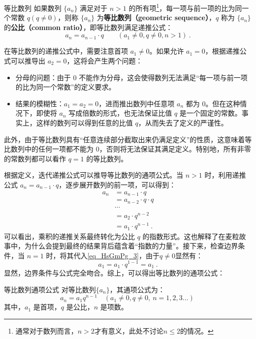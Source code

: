 \begin{definition}{等比数列}\label{def_HsGmPg_1}
如果数列 $\{a_n\}$ 满足对于 $n > 1$ 的所有项\footnote{通常对于数列而言，$n>2$才有意义，此处不讨论$n\leq2$的情况。}，每一项与前一项的比为同一个常数 $q(q\neq0)$，则称 $\{a_n\}$ 为\textbf{等比数列（geometric sequence）}，$q$ 称为 $\{a_n\}$ 的\textbf{公比（common ratio）}，即等比数列满足递推公式：
\begin{equation}
a_{n}=a_{n-1}\cdot q\qquad( a_1\neq0,q\neq0,n>1)~.
\end{equation}
\end{definition}
在等比数列的递推公式中，需要注意首项 $a_1 \neq 0$。如果允许 $a_1 = 0$，根据递推公式可以推导出 $a_2 = 0$，这将会产生两个问题：
\begin{itemize}
\item 分母的问题：由于 $0$ 不能作为分母，这会使得数列无法满足“每一项与前一项的比为同一个常数”的定义要求。
\item 结果的模糊性：$a_1=a_2=0$，进而推出数列中任意项 $a_n$ 都为 $0$。但在这种情况下，即使将 $a_n$ 写成倍数的形式，也无法保证比值 $q$ 是一个固定的常数。事实上，这样的数列可以得到任意的比值 $q$，从而失去了定义的严谨性。
\end{itemize}
此外，由于等比数列具有“任意连续部分截取出来仍满足定义”的性质，这意味着等比数列中的任何一项都不能为 $0$，否则将无法保证其满足定义。特别地，所有非零的常数列都可以看作 $q = 1$ 的等比数列。

根据定义，迭代递推公式可以推导等比数列的通项公式。当 $n > 1$ 时，利用递推公式 $a_n = a_{n-1} \cdot q$，逐步展开数列的前一项，可以得到：
\begin{equation}\label{eq_HsGmPg_3}
\begin{aligned}
a_n &= a_{n-1} \cdot q\\
&= a_{n-2}\cdot q\cdot q\\
&\cdots \\
&= a_2\cdot q^{n-2}\\
&=  a_1 \cdot q^{n-1}~.
\end{aligned}
\end{equation}
可以看出，乘积的递推关系最终转化为公比 $q$ 的指数形式。这也解释了在麦粒故事中，为什么会提到最终的结果背后蕴含着“指数的力量”。接下来，检查边界条件，当 $n = 1$ 时，将其代入\autoref{eq_HsGmPg_3}，由于$q\neq0$显然有：
\begin{equation}
a_1=a_1\cdot q^{1-1}=a_1~.
\end{equation}
显然，边界条件与公式完全吻合。综上，可以得出等比数列的通项公式：
\begin{corollary}{等比数列通项公式}
对等比数列$\{a_n\}$，其通项公式为：
\begin{equation}
a_n = a_1 q^{n-1} \quad (a_1\neq0, q\ne 0,\ n=1,2,3\dots)~
\end{equation}
其中，$a_1$ 是首项，$q$ 是公比，$n$ 是项数。
\end{corollary}

